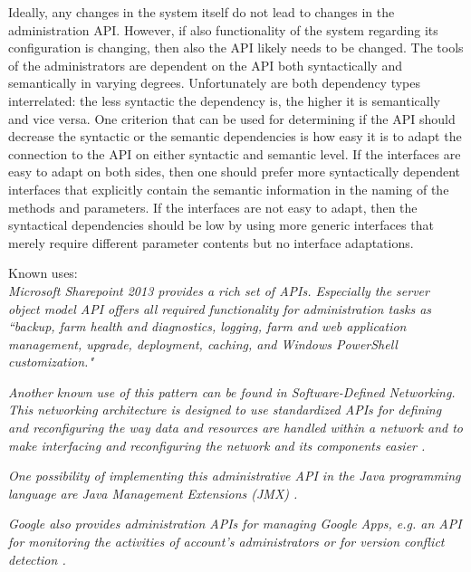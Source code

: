 Ideally, any changes in the system itself do not lead to changes in the administration API. However, if also functionality of the system regarding its configuration is changing, then also the API likely needs to be changed. The tools of the administrators are dependent on the API both syntactically and semantically in varying degrees. Unfortunately are both dependency types interrelated: the less syntactic the dependency is, the higher it is semantically and vice versa. One criterion that can be used for determining if the API should decrease the syntactic or the semantic dependencies is how easy it is to adapt the connection to the API on either syntactic and semantic level. If the interfaces are easy to adapt on both sides, then one should prefer more syntactically dependent interfaces that explicitly contain the semantic information in the naming of the methods and parameters. If the interfaces are not easy to adapt, then the syntactical dependencies should be low by using more generic interfaces that merely require different parameter contents but no interface adaptations.  


Known uses:\\
\textit{Microsoft Sharepoint 2013 provides a rich set of APIs. Especially the server object model API offers all required functionality for administration tasks as ``backup, farm health and diagnostics, logging, farm and web application management, upgrade, deployment, caching, and Windows PowerShell customization." \cite{Microsoft2013}}

\textit{Another known use of this pattern can be found in Software-Defined Networking. This networking architecture is designed to use standardized APIs for defining and reconfiguring the way data and resources are handled within a network and to make interfacing and reconfiguring the network and its components easier \cite{Kirkpatrick2013}.}

\textit{One possibility of implementing this administrative API in the Java programming language are Java Management Extensions (JMX) \cite{Oracle2014}. }

\textit{Google also provides administration APIs for managing Google Apps, e.g. an API for monitoring the activities of account's administrators or for version conflict detection \cite{GoogleAppsPlatform2014}.}

%
%
%
